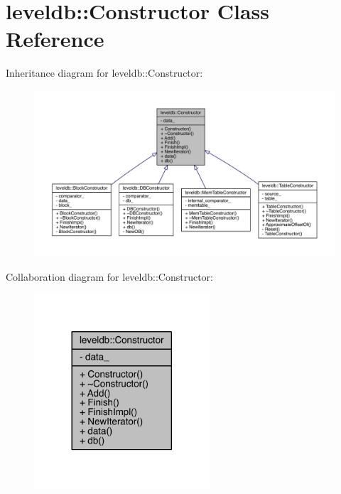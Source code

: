 \hypertarget{classleveldb_1_1_constructor}{}\section{leveldb\+:\+:Constructor Class Reference}
\label{classleveldb_1_1_constructor}


Inheritance diagram for leveldb\+:\+:Constructor\+:\nopagebreak
\begin{figure}[H]
\begin{center}
\leavevmode
\includegraphics[width=350pt]{classleveldb_1_1_constructor__inherit__graph}
\end{center}
\end{figure}


Collaboration diagram for leveldb\+:\+:Constructor\+:\nopagebreak
\begin{figure}[H]
\begin{center}
\leavevmode
\includegraphics[width=185pt]{classleveldb_1_1_constructor__coll__graph}
\end{center}
\end{figure}
